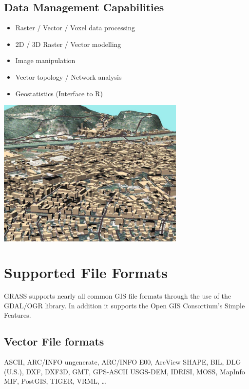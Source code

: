 \documentclass[notumble,a4paper,10pt,nofoldmark]{leaflet}
\newenvironment{myfig}[1][0pt plus 1.5ex minus .5ex]{\par\vspace*{#1}\begin{minipage}{\textwidth}\centering}{\end{minipage}}
\begin{document}
\subsection{Data Management Capabilities}

\begin{itemize}
\item Raster / Vector / Voxel data processing
\item 2D / 3D Raster / Vector modelling
\item Image manipulation
\item Vector topology / Network analysis
\item Geostatistics (Interface to R)
\end{itemize}

\begin{myfig}[1ex]
\includegraphics[width=0.7\textwidth]{trento3d}
\end{myfig}

\section{Supported File Formats}

GRASS supports nearly all common GIS file formats through the use of the GDAL/OGR library. In addition it supports the Open GIS Consortium's Simple Features.

\subsection{Vector File formats}
ASCII, ARC/INFO ungenerate, ARC/INFO E00, Arc\-View SHAPE, BIL, DLG (U.S.), DXF, DXF3D, GMT, GPS-ASCII USGS-DEM, IDRISI, MOSS, MapInfo MIF, PostGIS, TIGER, VRML, \dots
\end{document}

